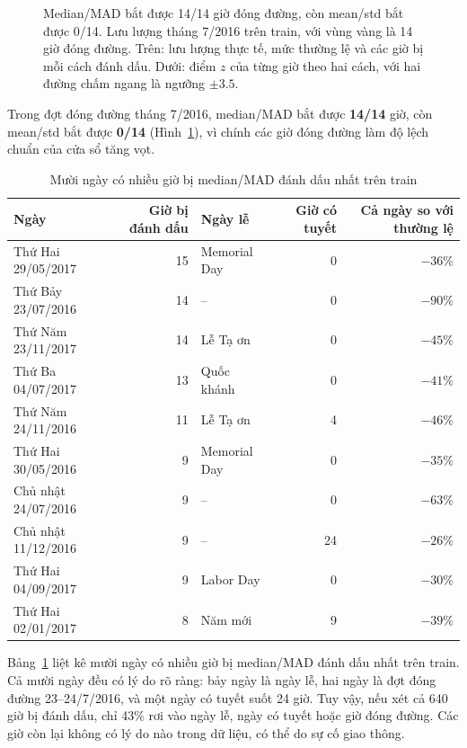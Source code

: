 \begin{figure}[H]
\centering
{}
\caption{Median/MAD bắt được 14/14 giờ đóng đường, còn mean/std bắt được 0/14. Lưu lượng tháng 7/2016 trên train, với vùng vàng là
14 giờ đóng đường. Trên: lưu lượng thực tế, mức thường lệ và các giờ bị
mỗi cách đánh dấu. Dưới: điểm $z$ của từng giờ theo hai cách, với hai đường chấm ngang là ngưỡng $\pm 3.5$.}
\label{fig:ts-outlier}
\end{figure}

Trong đợt đóng đường tháng 7/2016, median/MAD bắt được \textbf{14/14} giờ, còn mean/std bắt được \textbf{0/14} (Hình~\ref{fig:ts-outlier}),
vì chính các giờ đóng đường làm độ lệch chuẩn của cửa sổ tăng vọt.

\begin{table}[H]
\centering
\caption{Mười ngày có nhiều giờ bị median/MAD đánh dấu nhất trên train}
\label{tab:ts-flagged-days}
\small
\begin{tabular}{lrlrr}
\toprule
Ngày & Giờ bị đánh dấu & Ngày lễ & Giờ có tuyết & Cả ngày so với thường lệ\\
\midrule
Thứ Hai 29/05/2017 & 15 & Memorial Day & 0 & $-36\%$\\
Thứ Bảy 23/07/2016 & 14 & -- & 0 & $-90\%$\\
Thứ Năm 23/11/2017 & 14 & Lễ Tạ ơn & 0 & $-45\%$\\
Thứ Ba 04/07/2017 & 13 & Quốc khánh & 0 & $-41\%$\\
Thứ Năm 24/11/2016 & 11 & Lễ Tạ ơn & 4 & $-46\%$\\
Thứ Hai 30/05/2016 & 9 & Memorial Day & 0 & $-35\%$\\
Chủ nhật 24/07/2016 & 9 & -- & 0 & $-63\%$\\
Chủ nhật 11/12/2016 & 9 & -- & 24 & $-26\%$\\
Thứ Hai 04/09/2017 & 9 & Labor Day & 0 & $-30\%$\\
Thứ Hai 02/01/2017 & 8 & Năm mới & 9 & $-39\%$\\
\bottomrule
\end{tabular}
\end{table}

Bảng~\ref{tab:ts-flagged-days} liệt kê mười ngày có nhiều giờ bị median/MAD đánh dấu nhất trên train. Cả mười ngày đều có lý do rõ
ràng: bảy ngày là ngày lễ, hai ngày là đợt đóng đường 23--24/7/2016, và một ngày có tuyết suốt 24 giờ. Tuy vậy, nếu xét cả 640 giờ bị đánh
dấu, chỉ 43\% rơi vào ngày lễ, ngày có tuyết hoặc giờ đóng đường. Các giờ còn lại không có lý do nào trong dữ liệu, có thể do sự cố giao
thông.

